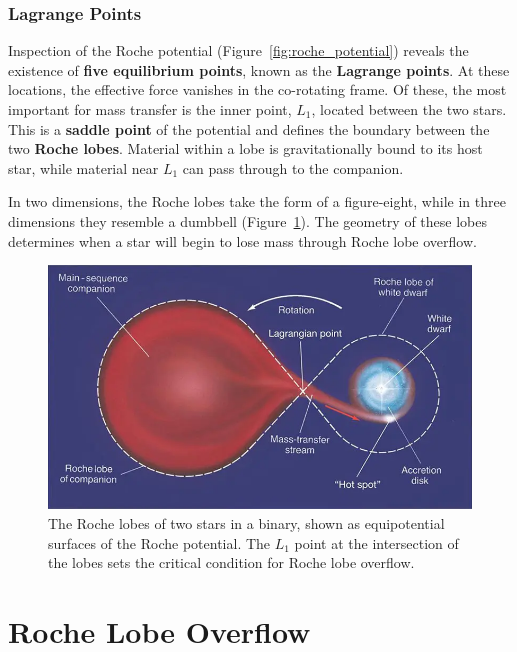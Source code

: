\subsubsection{Lagrange Points}

Inspection of the Roche potential (Figure~\ref{fig:roche_potential}) reveals the existence of \textbf{five equilibrium points}, known as the \textbf{Lagrange points}. At these locations, the effective force vanishes in the co-rotating frame. Of these, the most important for mass transfer is the inner point, $L_1$, located between the two stars. This is a \textbf{saddle point} of the potential and defines the boundary between the two \textbf{Roche lobes}. Material within a lobe is gravitationally bound to its host star, while material near $L_1$ can pass through to the companion. 

In two dimensions, the Roche lobes take the form of a figure-eight, while in three dimensions they resemble a dumbbell (Figure~\ref{fig:roche_lobes}). The geometry of these lobes determines when a star will begin to lose mass through Roche lobe overflow.

\begin{figure}
    \centering
    \includegraphics[width=0.75\linewidth]{Pictures/figures/roche_lobes.png}
    \caption{The Roche lobes of two stars in a binary, shown as equipotential surfaces of the Roche potential. The $L_1$ point at the intersection of the lobes sets the critical condition for Roche lobe overflow.}
    \label{fig:roche_lobes}
\end{figure}

\section{Roche Lobe Overflow}

